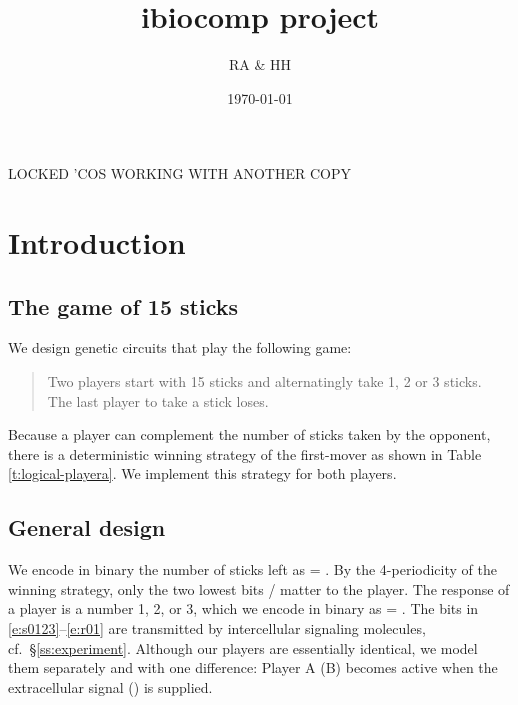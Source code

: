 \documentclass[12pt,notitlepage]{article}
\title{ibiocomp project}
\author{RA \& HH}
\date{\today}
\def\[#1\]{\begin{align}#1\end{align}}
\newcommand{\ra}[1]{{\color{Blue}#1}}
\begin{document}
\maketitle

\ra{LOCKED 'COS WORKING WITH ANOTHER COPY}

\section{Introduction}

\subsection{The game of 15 sticks}

We design genetic circuits
that play the following game:
%
\begin{quote}
	Two players start with 15 sticks
	and alternatingly 
	take 1, 2 or 3 sticks.
	\\
	The last player to take a stick loses.
\end{quote}

Because a player can complement
the number of sticks taken by the opponent,
there is a deterministic winning strategy
of the first-mover
as shown in Table \ref{t:logical-playera}.
%
%
We implement this strategy for both players.


\subsection{General design}

We encode in binary 
the number of sticks left as
\[
    \label{e:s0123}
     = 
    .
\]
%
%
By the 4-periodicity of the winning strategy,
only the two lowest bits /
matter to the player.
%
%
The response of a player is a number 1, 2, or 3,
which we encode in binary as
\[
    \label{e:r01}
     = 
    .
\]
%
The bits in \eqref{e:s0123}--\eqref{e:r01}
are transmitted by 
intercellular signaling molecules,
cf.~\S\ref{ss:experiment}.
%
Although our players are essentially identical,
we model them separately and with one difference:
Player A (B) becomes active when 
the extracellular signal  () is supplied.

%
\end{document}
